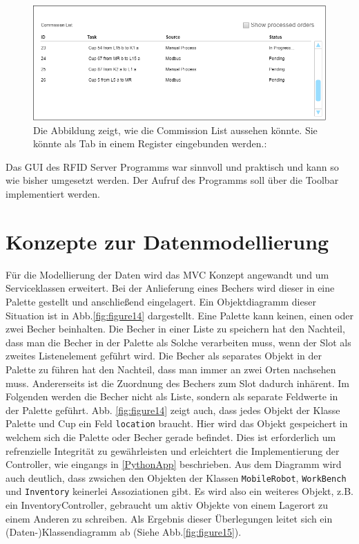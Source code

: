 \begin{figure}
        \caption[Mockup der Commission List]
        {\small Die Abbildung zeigt, wie die Commission List aussehen könnte. Sie könnte als Tab in einem Register eingebunden werden.:
        }\label{fig:figure13}
        \includegraphics[width = \textwidth ]{Bilder/Mockup_CommissionList}
        \centering
\end{figure}
\vspace{1cm}
Das GUI des RFID Server Programms war sinnvoll und praktisch und kann so wie bisher umgesetzt werden.
Der Aufruf des Programms soll über die Toolbar implementiert werden.

\section{Konzepte zur Datenmodellierung}

Für die Modellierung der Daten wird das MVC Konzept angewandt und um Serviceklassen erweitert.
Bei der Anlieferung eines Bechers wird dieser in eine Palette gestellt und anschließend eingelagert.
Ein Objektdiagramm dieser Situation ist in Abb.\ref{fig:figure14} dargestellt.
Eine Palette kann keinen, einen oder zwei Becher beinhalten.
Die Becher in einer Liste zu speichern hat den Nachteil, dass man die Becher in der Palette als Solche verarbeiten muss,
wenn der Slot als zweites Listenelement geführt wird.
Die Becher als separates Objekt in der Palette zu führen hat den Nachteil, dass man immer an zwei Orten nachsehen muss.
Andererseits ist die Zuordnung des Bechers zum Slot dadurch inhärent.
Im Folgenden werden die Becher nicht als Liste, sondern als separate Feldwerte in der Palette geführt.
Abb. \ref{fig:figure14} zeigt auch, dass jedes Objekt der Klasse Palette und Cup ein Feld \verb|location| braucht.
Hier wird das Objekt gespeichert in welchem sich die Palette oder Becher gerade befindet.
Dies ist erforderlich um refrenzielle Integrität zu gewährleisten und erleichtert die Implementierung der Controller,
wie eingangs in \ref{PythonApp} beschrieben.
Aus dem Diagramm wird auch deutlich, dass zwsichen den Objekten der Klassen \verb|MobileRobot|, \verb|WorkBench| und
\verb|Inventory| keinerlei Assoziationen gibt.
Es wird also ein weiteres Objekt, z.B. ein InventoryController, gebraucht um aktiv Objekte von einem Lagerort zu einem Anderen
zu schreiben.
Als Ergebnis dieser Überlegungen leitet sich ein (Daten-)Klassendiagramm ab (Siehe Abb.\ref{fig:figure15}).



